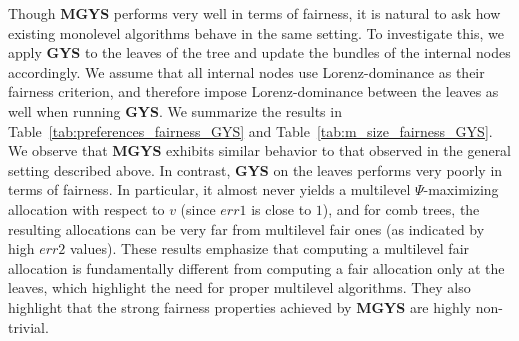 \documentclass[]{article}
\begin{document}
Though \textbf{MGYS} performs very well in terms of fairness, it is natural to ask how existing monolevel algorithms behave in the same setting. To investigate this, we apply \textbf{GYS} to the leaves of the tree and update the bundles of the internal nodes accordingly. We assume that all internal nodes use Lorenz-dominance as their fairness criterion, and therefore impose Lorenz-dominance between the leaves as well when running \textbf{GYS}. We summarize the results in Table~\ref{tab:preferences_fairness_GYS} and Table~\ref{tab:m_size_fairness_GYS}. We observe that \textbf{MGYS} exhibits similar behavior to that observed in the general setting described above. In contrast, \textbf{GYS} on the leaves performs very poorly in terms of fairness. In particular, it almost never yields a multilevel $\Psi$-maximizing allocation with respect to $v$ (since $err1$ is close to $1$), and for comb trees, the resulting allocations can be very far from multilevel fair ones (as indicated by high $err2$ values). These results emphasize that computing a multilevel fair allocation is fundamentally different from computing a fair allocation only at the leaves, which highlight the need for proper multilevel algorithms. They also highlight that the strong fairness properties achieved by \textbf{MGYS} are highly non-trivial.
\end{document}
